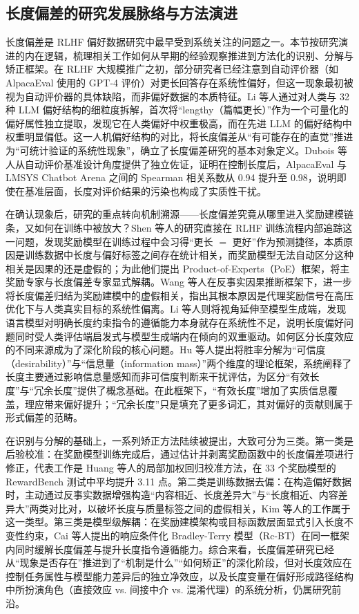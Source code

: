 \documentclass[9pt,a4paper,fontset=windows]{ctexart}
\theoremstyle{definition}
\numberwithin{equation}{section}
\begin{document}
\subsection{长度偏差的研究发展脉络与方法演进}
长度偏差是 RLHF 偏好数据研究中最早受到系统关注的问题之一。本节按研究演进的内在逻辑，梳理相关工作如何从早期的经验观察推进到方法化的识别、分解与矫正框架。在 RLHF 大规模推广之初，部分研究者已经注意到自动评价器（如 AlpacaEval 使用的 GPT-4 评价）对更长回答存在系统性偏好，但这一现象最初被视为自动评价器的具体缺陷，而非偏好数据的本质特征。Li 等人通过对人类与 32 种 LLM 偏好结构的细粒度拆解，首次将“lengthy（篇幅更长）”作为一个可量化的偏好属性独立提取，发现它在人类偏好中权重极高，而在先进 LLM 的偏好结构中权重明显偏低。这一人机偏好结构的对比，将长度偏差从“有可能存在的直觉”推进为“可统计验证的系统性现象”，确立了长度偏差研究的基本对象定义。Dubois 等人从自动评价基准设计角度提供了独立佐证，证明在控制长度后，AlpacaEval 与 LMSYS Chatbot Arena 之间的 Spearman 相关系数从 0.94 提升至 0.98，说明即使在基准层面，长度对评价结果的污染也构成了实质性干扰。

在确认现象后，研究的重点转向机制溯源——长度偏差究竟从哪里进入奖励建模链条，又如何在训练中被放大？Shen 等人的研究直接在 RLHF 训练流程内部追踪这一问题，发现奖励模型在训练过程中会习得“更长 \(=\) 更好”作为预测捷径，本质原因是训练数据中长度与偏好标签之间存在统计相关，而奖励模型无法自动区分这种相关是因果的还是虚假的；为此他们提出 Product-of-Experts（PoE）框架，将主奖励专家与长度偏差专家显式解耦。Wang 等人在反事实因果推断框架下，进一步将长度偏差归结为奖励建模中的虚假相关，指出其根本原因是代理奖励信号在高压优化下与人类真实目标的系统性偏离。Li 等人则将视角延伸至模型生成端，发现语言模型对明确长度约束指令的遵循能力本身就存在系统性不足，说明长度偏好问题同时受人类评估端启发式与模型生成端内在倾向的双重驱动。如何区分长度效应的不同来源成为了深化阶段的核心问题。Hu 等人提出将胜率分解为“可信度（desirability）”与“信息量（information mass）”两个维度的理论框架，系统阐释了长度主要通过影响信息量感知而非可信度判断来干扰评估，为区分“有效长度”与“冗余长度”提供了概念基础。在此框架下，“有效长度”增加了实质信息覆盖，理应带来偏好提升；“冗余长度”只是填充了更多词汇，其对偏好的贡献则属于形式偏差的范畴。

在识别与分解的基础上，一系列矫正方法陆续被提出，大致可分为三类。第一类是后验校准：在奖励模型训练完成后，通过估计并剥离奖励函数中的长度偏差项进行修正，代表工作是 Huang 等人的局部加权回归校准方法，在 33 个奖励模型的 RewardBench 测试中平均提升 3.11 点。第二类是训练数据去偏：在构造偏好数据时，主动通过反事实数据增强构造“内容相近、长度差异大”与“长度相近、内容差异大”两类对比对，以破坏长度与质量标签之间的虚假相关，Kim 等人的工作属于这一类型。第三类是模型级解耦：在奖励建模架构或目标函数层面显式引入长度不变性约束，Cai 等人提出的响应条件化 Bradley-Terry 模型（Rc-BT）在同一框架内同时缓解长度偏差与提升长度指令遵循能力。综合来看，长度偏差研究已经从“现象是否存在”推进到了“机制是什么”“如何矫正”的深化阶段，但对长度效应在控制任务属性与模型能力差异后的独立净效应，以及长度变量在偏好形成路径结构中所扮演角色（直接效应 vs. 间接中介 vs. 混淆代理）的系统分析，仍属研究前沿。
\end{document}
